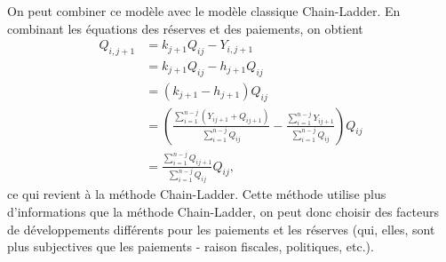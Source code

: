 On peut combiner ce modèle avec le modèle classique Chain-Ladder. En
combinant les équations des réserves et des paiements, on obtient
\begin{align*}
  Q_{i, j+1}
  &= k_{j+1} Q_{ij} - Y_{i, j+1}\\
  &= k_{j+1} Q_{ij} - h_{j+1}  Q_{ij} \\
  &= (k_{j+1} - h_{j+1}) Q_{ij} \\
  &= \left(\frac{\sum_{i=1}^{n-j} \left( Y_{i j+1} + Q_{i j+1} \right)}{\sum_{i=1}^{n-j} Q_{i j}}
    - \frac{\sum_{i=1}^{n-j} Y_{i j+1}}{\sum_{i=1}^{n-j} Q_{i j}} \right)  Q_{ij} \\
  &= \frac{\sum_{i=1}^{n-j} Q_{i j+1} }{\sum_{i=1}^{n-j} Q_{i j}}  Q_{ij},
\end{align*}
ce qui revient à la méthode Chain-Ladder. Cette méthode utilise plus
d'informations que la méthode Chain-Ladder, on peut donc choisir des
facteurs de développements différents pour les paiements et les
réserves (qui, elles, sont plus subjectives que les paiements - raison
fiscales, politiques, etc.).

